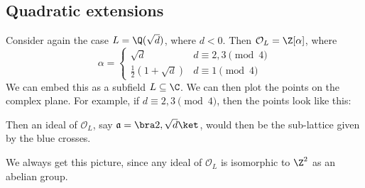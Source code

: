 \documentclass[a4paper]{article}
\begin{document}
\subsection{Quadratic extensions}
Consider again the case $L = \Q(\sqrt{d})$, where $d < 0$. Then $\mathcal{O}_L = \Z[\alpha]$, where
\[
  \alpha =
  \begin{cases}
    \sqrt{d} & d \equiv 2, 3\pmod 4\\
    \frac{1}{2}(1 + \sqrt{d})& d \equiv 1 \pmod 4
  \end{cases}
\]
We can embed this as a subfield $L \subseteq \C$. We can then plot the points on the complex plane. For example, if $d \equiv 2, 3 \pmod 4$, then the points look like this:
\begin{center}
\end{center}
Then an ideal of $\mathcal{O}_L$, say $\mathfrak{a} = \bra 2, \sqrt{d}\ket$, would then be the sub-lattice given by the blue crosses.
\begin{center}
\end{center}
We always get this picture, since any ideal of $\mathcal{O}_L$ is isomorphic to $\Z^2$ as an abelian group.
\end{document}
